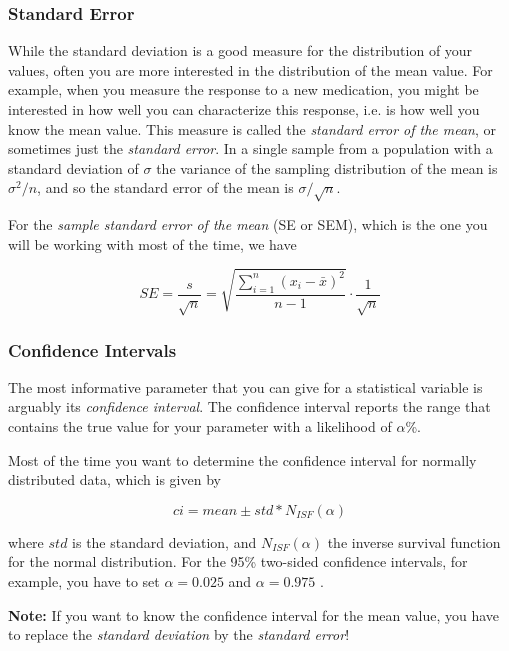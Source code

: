 \subsubsection{Standard Error} 
While the standard deviation is a good measure for the distribution of your values, often you are more interested in the distribution of the mean value. For example, when you measure the response to a new medication, you might be interested in how well you can characterize this response, i.e. is how well you know the mean value. This measure is called the \emph{standard error of the mean}, or sometimes just the \emph{standard error}. In a single sample from a population with a standard deviation of $\sigma$ the variance of the sampling distribution of the mean is $\sigma^2/n$, and so the standard error of the mean is $\sigma/\sqrt{n}$.

For the \emph{sample standard error of the mean} (SE or SEM), which is the one you will be working with most of the time, we have

\begin{equation}
  SE = \frac{s}{\sqrt{n}} = \sqrt{\frac{{\sum\limits_{i = 1}^n {({x_i-\bar{x}})^2} }}{n-1}} \cdot \frac{1}{\sqrt{n}}
\end{equation}

\subsubsection{Confidence Intervals}
The most informative parameter that you can give for a statistical variable is arguably its \emph{confidence interval}. The confidence interval reports the range that contains the true value for your parameter with a likelihood of $\alpha$\%.

Most of the time you want to determine the confidence interval for normally distributed data, which is given by

\begin{equation}
  ci = mean \pm std * N_{ISF}(\alpha)
\end{equation}\label{eq:ci}

where $std$ is the  standard deviation, and $N_{ISF}(\alpha)$ the inverse survival function for the normal distribution. For the 95\% two-sided confidence intervals, for example, you have to set $\alpha=0.025$ and $\alpha=0.975$ .

\textbf{Note:} If you want to know the confidence interval for the mean value, you have to replace the \emph{standard deviation} by the \emph{standard error}!

